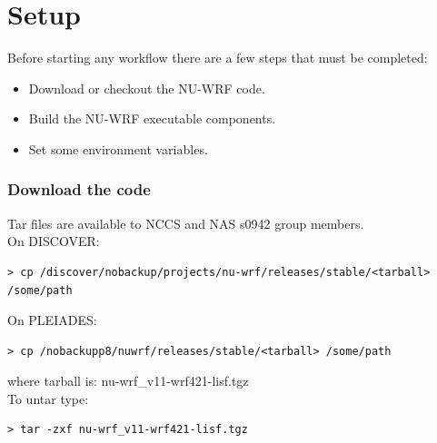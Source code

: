 \section{Setup}

\begin{frame}

Before starting any workflow there are a few steps that must be completed:
\begin{itemize}
     \item Download or checkout the NU-WRF code.
     \item Build the NU-WRF executable components.
     \item Set some environment variables.
\end{itemize}

\end{frame}

\begin{frame}[fragile]\frametitle{Download the code}

\footnotesize{
Tar files are available to NCCS and NAS s0942 group members. \\
On DISCOVER:
\begin{lstlisting}
> cp /discover/nobackup/projects/nu-wrf/releases/stable/<tarball> /some/path
\end{lstlisting}
On PLEIADES:
\begin{lstlisting}
> cp /nobackupp8/nuwrf/releases/stable/<tarball> /some/path
\end{lstlisting}
where tarball is:
nu-wrf\_v11-wrf421-lisf.tgz\\
\hfill \break
To untar type:
\begin{lstlisting}
> tar -zxf nu-wrf_v11-wrf421-lisf.tgz
\end{lstlisting}
}

\end{frame}


